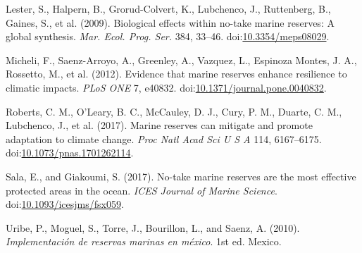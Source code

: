 \documentclass{frontiersSCNS}
\begin{document}
\hypertarget{ref-lester_2009-Ks}{}
Lester, S., Halpern, B., Grorud-Colvert, K., Lubchenco, J., Ruttenberg,
B., Gaines, S., et al. (2009). Biological effects within no-take marine
reserves: A global synthesis. \emph{Mar. Ecol. Prog. Ser.} 384, 33--46.
doi:\href{https://doi.org/10.3354/meps08029}{10.3354/meps08029}.

\hypertarget{ref-micheli_2012-EU}{}
Micheli, F., Saenz-Arroyo, A., Greenley, A., Vazquez, L., Espinoza
Montes, J. A., Rossetto, M., et al. (2012). Evidence that marine
reserves enhance resilience to climatic impacts. \emph{PLoS ONE} 7,
e40832.
doi:\href{https://doi.org/10.1371/journal.pone.0040832}{10.1371/journal.pone.0040832}.

\hypertarget{ref-roberts_2017-J9}{}
Roberts, C. M., O'Leary, B. C., McCauley, D. J., Cury, P. M., Duarte, C.
M., Lubchenco, J., et al. (2017). Marine reserves can mitigate and
promote adaptation to climate change. \emph{Proc Natl Acad Sci U S A}
114, 6167--6175.
doi:\href{https://doi.org/10.1073/pnas.1701262114}{10.1073/pnas.1701262114}.

\hypertarget{ref-sala_2017-69}{}
Sala, E., and Giakoumi, S. (2017). No-take marine reserves are the most
effective protected areas in the ocean. \emph{ICES Journal of Marine
Science}.
doi:\href{https://doi.org/10.1093/icesjms/fsx059}{10.1093/icesjms/fsx059}.

\hypertarget{ref-uribe_2010-u2}{}
Uribe, P., Moguel, S., Torre, J., Bourillon, L., and Saenz, A. (2010).
\emph{Implementación de reservas marinas en méxico}. 1st ed. Mexico.
\end{document}
